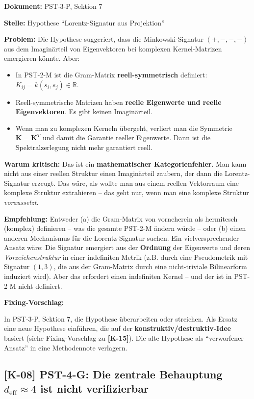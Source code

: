 \documentclass[11pt,a4paper]{article}
\newcommand{\K}[1]{\textbf{[K-#1]}}
\newcommand{\Dok}[1]{\noindent\textbf{Dokument:} #1\par\smallskip}
\newcommand{\Stelle}[1]{\noindent\textbf{Stelle:} #1\par\smallskip}
\newcommand{\Prob}[1]{\noindent\textbf{Problem:} #1\par\smallskip}
\newcommand{\Krit}[1]{\noindent\textbf{Warum kritisch:} #1\par\smallskip}
\newcommand{\Empf}[1]{\noindent\textbf{Empfehlung:} #1\par\smallskip}
\newenvironment{Fix}
  {\par\medskip\noindent\textbf{Fixing-Vorschlag:}\par\nobreak\smallskip}
  {\par\medskip}
\begin{document}
\Dok{PST-3-P, Sektion 7}
\Stelle{Hypothese ``Lorentz-Signatur aus Projektion''}
\Prob{Die Hypothese suggeriert, dass die Minkowski-Signatur
$(+,-,-,-)$ aus dem Imaginärteil von Eigenvektoren bei komplexen
Kernel-Matrizen emergieren könnte. Aber:
\begin{itemize}
  \item In PST-2-M ist die Gram-Matrix \textbf{reell-symmetrisch}
    definiert: $K_{ij} = k(s_i, s_j) \in \mathbb{R}$.
  \item Reell-symmetrische Matrizen haben \textbf{reelle Eigenwerte und
    reelle Eigenvektoren}. Es gibt keinen Imaginärteil.
  \item Wenn man zu komplexen Kerneln übergeht, verliert man die
    Symmetrie $\mathbf{K} = \mathbf{K}^T$ und damit die Garantie
    reeller Eigenwerte. Dann ist die Spektralzerlegung nicht mehr
    garantiert reell.
\end{itemize}}
\Krit{Das ist ein \textbf{mathematischer Kategorienfehler}. Man kann
nicht aus einer reellen Struktur einen Imaginärteil zaubern, der
dann die Lorentz-Signatur erzeugt. Das wäre, als wollte man aus einem
reellen Vektorraum eine komplexe Struktur extrahieren -- das geht
nur, wenn man eine komplexe Struktur \emph{voraussetzt}.}
\Empf{Entweder (a) die Gram-Matrix von vorneherein als hermitesch
(komplex) definieren -- was die gesamte PST-2-M ändern würde --
oder (b) einen anderen Mechanismus für die Lorentz-Signatur suchen.
Ein vielversprechender Ansatz wäre: Die Signatur emergiert aus der
\textbf{Ordnung} der Eigenwerte und deren \emph{Vorzeichenstruktur}
in einer indefiniten Metrik (z.B. durch eine Pseudometrik mit
Signatur $(1,3)$, die aus der Gram-Matrix durch eine nicht-triviale
Bilinearform induziert wird). Aber das erfordert einen indefiniten
Kernel -- und der ist in PST-2-M nicht definiert.}
\begin{Fix}
In PST-3-P, Sektion 7, die Hypothese überarbeiten oder
streichen. Als Ersatz eine neue Hypothese einführen, die auf der
\textbf{konstruktiv/destruktiv-Idee} basiert (siehe Fixing-Vorschlag
zu \textbf{[K-15]}). Die alte Hypothese als ``verworfener Ansatz''
in eine Methodennote verlagern.
\end{Fix}

\subsection{\K{08} PST-4-G: Die zentrale Behauptung $d_{\text{eff}} \approx 4$ ist nicht verifizierbar}
\end{document}
